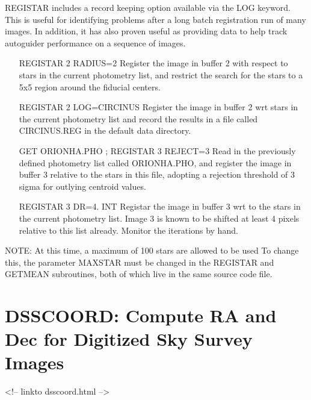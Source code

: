 REGISTAR includes a record keeping option available via the LOG keyword.
This is useful for identifying problems after a long batch registration run
of many images.  In addition, it has also proven useful as providing data
to help track autoguider performance on a sequence of images.

\begin{itemize}
  \item[REGISTAR 2 RADIUS=2\hfill]{Register the image in buffer 2 with
       respect to stars in the current photometry list, and restrict the
       search for the stars to a 5x5 region around the fiducial centers.}

  \item[REGISTAR 2 LOG=CIRCINUS \hfill]{Register the image in buffer 2 wrt
       stars in the current photometry list and record the results in a
       file called CIRCINUS.REG in the default data directory.}

  \item[GET ORIONHA.PHO ; REGISTAR 3 REJECT=3\hfill]{ Read in the
       previously defined photometry list called ORIONHA.PHO, and register
       the image in buffer 3 relative to the stars in this file, adopting a
       rejection threshold of 3 sigma for outlying centroid values.}

  \item[REGISTAR 3 DR=4. INT\hfill]{Registar the image in buffer 3 wrt to
       the stars in the current photometry list.  Image 3 is known to be
       shifted at least 4 pixels relative to this list already.  Monitor
       the iterations by hand.}
\end{itemize}

NOTE: At this time, a maximum of 100 stars are allowed to be used To change
this, the parameter MAXSTAR must be changed in the REGISTAR and GETMEAN
subroutines, both of which live in the same source code file.

\section{DSSCOORD: Compute RA and Dec for Digitized Sky Survey Images}
\begin{rawhtml}
<!-- linkto dsscoord.html -->
\end{rawhtml}

